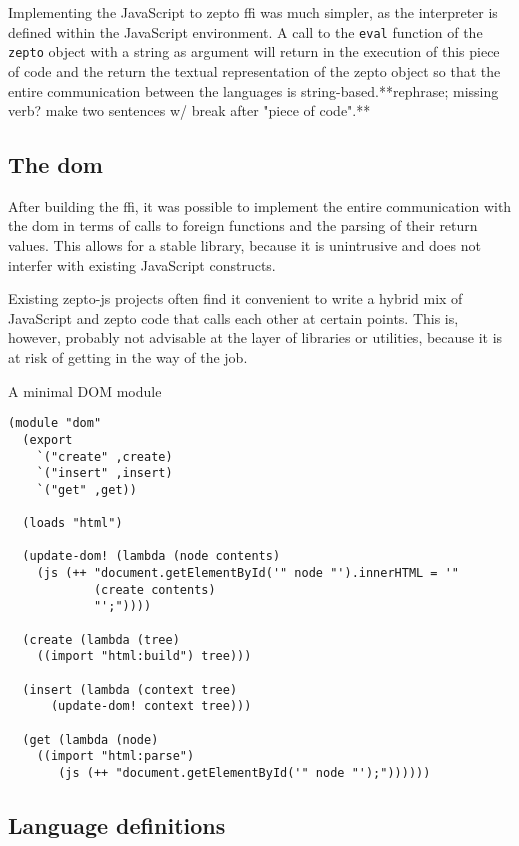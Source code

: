 \documentclass[oneside,11pt,xetex]{scrbook}
\begin{document}
Implementing the JavaScript to zepto \gls{ffi} was much simpler, as the
interpreter is defined within the JavaScript environment. A call to the
\texttt{eval} function of the \texttt{zepto} object with a string as argument
will return in the execution of this piece of code and the return the textual
representation of the zepto object so that the entire communication between
the languages is string-based.**rephrase; missing verb? make two sentences w/ break after "piece of code".**

\subsection{The \gls{dom}}

After building the \gls{ffi}, it was possible to implement the entire
communication with the \gls{dom} in terms of calls to foreign functions
and the parsing of their return values. This allows for a stable library,
because it is unintrusive and does not interfer with existing JavaScript
constructs.

Existing zepto-js projects often find it convenient to write a hybrid mix
of JavaScript and zepto code that calls each other at certain points.
This is, however, probably not advisable at the layer of libraries or
utilities, because it is at risk of getting in the way of the job.

\begin{listing}[H]
\caption{A minimal DOM module}
\begin{verbatim}
(module "dom"
  (export
    `("create" ,create)
    `("insert" ,insert)
    `("get" ,get))

  (loads "html")

  (update-dom! (lambda (node contents)
    (js (++ "document.getElementById('" node "').innerHTML = '"
            (create contents)
            "';"))))

  (create (lambda (tree)
    ((import "html:build") tree)))

  (insert (lambda (context tree)
      (update-dom! context tree)))

  (get (lambda (node)
    ((import "html:parse")
       (js (++ "document.getElementById('" node "');"))))))
\end{verbatim}
\end{listing}

\subsection{Language definitions}
\end{document}
